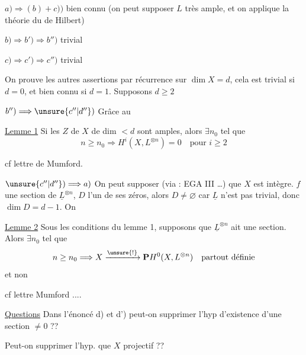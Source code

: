 $a)\Longrightarrow(b)+c))$ bien connu (on peut supposer $L$ très ample, et on applique la théorie du  de Hilbert)

$b)\Longrightarrow b')\Longrightarrow b'')$ trivial

$c)\Longrightarrow c')\Longrightarrow c'')$ trivial

On prouve les autres assertions par récurrence sur  $\dim X=d$, cela est trivial si $d=0$, et bien connu si $d=1$. Supposons $d\geq2$

$b'')\Longrightarrow\unsure{c''|d''})$ Grâce au

\uline{Lemme 1} Si les  $Z$ de $X$ de dim $<d$ sont amples, alors $\exists n_0$ tel que
\[
n\geq n_0\Longrightarrow H^i(X,L^{\otimes n})=0\quad\text{pour }i\geq2
\]


cf lettre de Mumford.



$\unsure{c''|d''})\Longrightarrow a)$ On peut supposer (via : EGA III \ldots) que $X$ est intègre.    $f$ une section de $\underline L^{\otimes n}$,  $D$ l'un de ses zéros, alors $D\neq\varnothing$ car $\underline L$ n'est pas trivial, donc $\dim D=d-1$. On 

\uline{Lemme 2} Sous les conditions du lemme 1, supposons  que $\underline L^{\otimes n}$ ait une section. Alors \deleted{$\unsure{\exists}$} $\exists n_0$ tel que
\[
n\geq n_0\Longrightarrow X\xrightarrow{\unsure{!}}\mathbf P H^0(X,L^{\otimes n})\quad\text{partout définie}
\]
et non 


cf lettre Mumford ....

\uline{Questions} Dans l'énoncé d) et d') peut-on supprimer l'hyp d'existence d'une section $\neq0$ ?? 

 Peut-on supprimer l'hyp. que $X$ projectif ??

